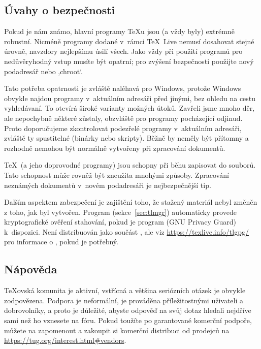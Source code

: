 \documentclass[\classoptions,slovak,english,czech]{\classname}
\newcommand{\singleuv}[1]{,#1`}
\begin{document}
\subsection{Úvahy o bezpečnosti}
\label{sec:security}

Pokud je nám známo, hlavní programy \TeX{u} jsou (a vždy byly)
extrémně robustní. Nicméně programy dodané v~rámci \TeX\ Live nemusí dosahovat
stejné úrovně, navzdory nejlepšímu úsilí všech. Jako vždy při použití programů
pro nedůvěryhodný vstup musíte být opatrní; pro zvýšení bezpečnosti použijte
nový podadresář nebo \singleuv{chroot}.

Tato potřeba opatrnosti je zvláště naléhavá pro Windows, protože 
Windows obvykle najdou programy v~aktuálním adresáři před jinými,
bez ohledu na cestu vyhledávaní. To otevírá široké varianty možných
útoků. Zavřeli jsme mnoho děr, ale nepochybně některé zůstaly,
obzvláště pro programy pocházející odjinud. Proto doporučujeme 
zkontrolovat podezřelé programy v~aktuálním adresáři, zvláště ty spustitelné 
(binárky nebo skripty). Běžně by neměly být přítomny a rozhodně
nemohou být normálně vytvořeny při zpracování dokumentů.

\TeX\ (a jeho doprovodné programy) jsou schopny při běhu
zapisovat do souborů. Tato schopnost může rovněž být zneužita 
mnohými způsoby. Zpracování neznámých dokumentů v~novém podadresáři 
je nejbezpečnější tip.

Dalším aspektem zabezpečení je zajištění toho, že stažený materiál nebyl
změněn z toho, jak byl vytvořen. Program 
(sekce~\ref{sec:tlmgr}) automaticky provede kryptografické
ověření stahování, pokud je program  (GNU Privacy Guard)
k~dispozici. Není distribuován jako součást \TL, ale viz
\url{https://texlive.info/tlgpg/} pro informace o , pokud
je potřebný.

\subsection{Nápověda}
\label{sec:help}

\TeX{}ovská komunita je aktivní, vstřícná a většina
seriózních otázek je obvykle zodpovězena. Podpora je
neformální, je prováděna příležitostnými uživateli a dobrovolníky,
a proto je důležité, abyste odpověď na svůj dotaz hledali nejdříve sami
než ho vznesete na fóru. Pokud toužíte po garantované komerční podpoře,
můžete na \TL{} zapomenout a zakoupit si komerční distribuci od
prodejců na \url{https://tug.org/interest.html#vendors}.
\end{document}
